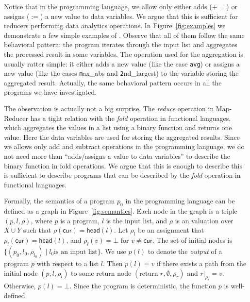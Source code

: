 \documentclass[runningheads,a4paper]{llncs}
\newcommand\cur{\mathsf{cur}}
\newcommand\head{\mathsf{head}}
\newcommand\addeq{+\!\!=}
\newcommand{\sub}[2]{#1|_{#2}}
\begin{document}
Notice that in the programming language, we allow only either adds ($\addeq$) or assigns ($:=$) a new value to data variables. 
We argue that this is sufficient for reducers performing data analytics operations.
In Figure~\ref{fig:examples} we demonstrate a few simple examples of . Observe that all of them follow the same behavioral pattern: the program iterates through the input list and aggregates the processed result in some variables. The operation used for the aggregation is usually ratter simple: it either adds a new value (like the case \texttt{avg}) or assigns a new value (like the cases {\texttt max\_abs} and {\texttt 2nd\_largest}) to the variable storing the aggregated result. Actually, the same behavioral pattern occurs in all the programs we have investigated.

The observation is actually not a big surprise. The \emph{reduce} operation in Map-Reducer has a tight relation with the \emph{fold} operation in functional languages, which aggregates the values in a list using a binary function and returns one value. Here the data variables are used for storing the aggregated results. Since we allows only add and subtract operations in the programming language, we do not need more than ``adds/assigns a value to data variables'' to describe the binary function in fold operations. We argue that this is enough to describe this is sufficient to describe programs that can be described by the \emph{fold} operation in functional languages.

Formally, the semantics of a program $p_0$ in the programming language can be defined as a graph in Figure~\ref{fig:semantics}. Each node in the graph is a triple $(p,l,\rho)$, where $p$ is a program, $l$ is the input list, and $\rho$ is an valuation over $X\cup Y$ such that $\rho(\cur)=\head(l)$. Let $\rho_l$ be an assignment that $\rho_l(\cur)=\head(l)$, and $\rho_l(v)=\bot$ for $v\neq \cur$.
The set of initial nodes is $\{(p_0,l_0,\rho_{l_0})\mid l_0\mbox{is an input list}\}$.
We use $p(l)$ to denote the \emph{output} of a program $p$ with respect to a list $l$. Then $p(l) =v$ if there exists a path from the initial node $(p, l, \rho_l)$ to some return node $(\mbox{return }r,  \emptyset, \rho_r)$ and $\sub{r}{\rho_r}=v$. Otherwise, $p(l)=\bot$. Since the program is deterministic, the function $p$ is well-defined. 
\end{document}
